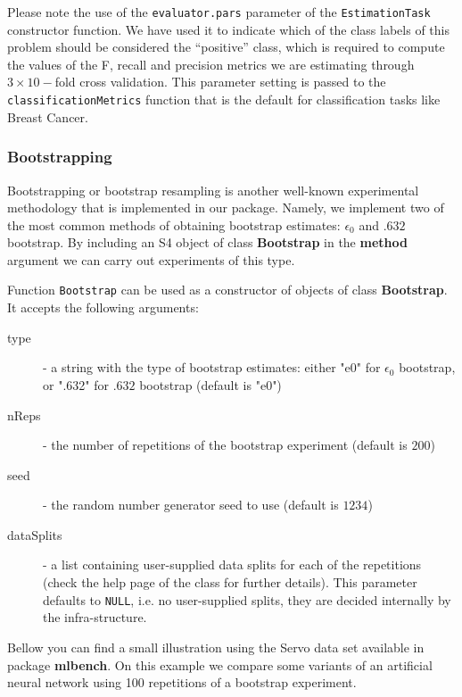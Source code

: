 \documentclass[10pt,a4paper]{article}\usepackage[]{graphicx}\usepackage[]{color}
\begin{document}
Please note the use of the \texttt{evaluator.pars} parameter of the
\texttt{EstimationTask} constructor function. We have used it to indicate which of the class labels of this problem should be considered the ``positive'' class, which is required to compute the values of the F, recall and precision metrics we are estimating through $3\times 10-$fold cross validation. This parameter setting is passed to the \texttt{classificationMetrics} function that is the default for classification tasks like Breast Cancer.

\subsubsection{Bootstrapping}

Bootstrapping or bootstrap resampling is another well-known
experimental methodology that is implemented in our
package. Namely, we implement two of the most common methods of obtaining bootstrap estimates: $\epsilon_0$ and $.632$ bootstrap.
By including an S4 object of class
\textbf{Bootstrap} in the \textbf{method} argument we can carry out experiments of this
type.

Function \texttt{Bootstrap} can be used as a constructor of
objects of class \textbf{Bootstrap}. It accepts the following
arguments:

\begin{description}
\item[type] - a string with the type of bootstrap estimates: either "e0" for $\epsilon_0$ bootstrap, or ".632" for $.632$ bootstrap (default is "e0")
\item[nReps] - the number of repetitions of the bootstrap experiment (default is $200$)
\item[seed] - the random number generator seed to use (default is $1234$)
\item[dataSplits] - a list containing user-supplied data splits
  for each of the repetitions (check the help page of the
  class for further details). This parameter defaults to
  \texttt{NULL}, i.e. no user-supplied splits, they are decided
  internally by the infra-structure.
\end{description}

Bellow you can find a small illustration using the Servo data set available in package \textbf{mlbench}. On this example we compare some variants of an artificial neural network using 100 repetitions of a bootstrap experiment. 
\end{document}

